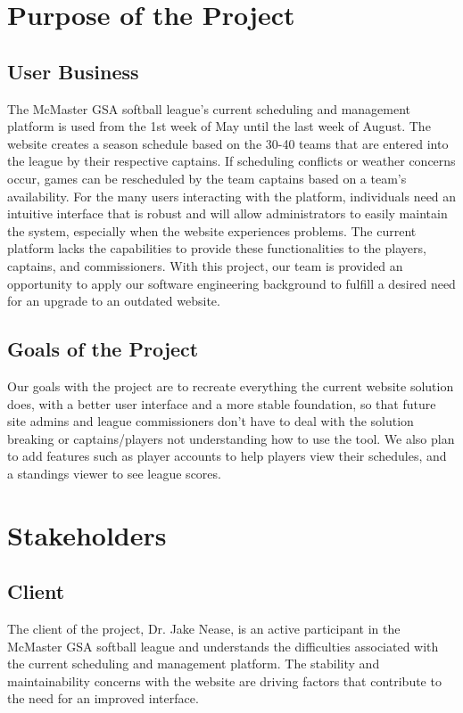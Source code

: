 \documentclass[12pt]{article}
\begin{document}
\section{Purpose of the Project}

\subsection{User Business}

The McMaster GSA softball league's current scheduling and management platform
is used from the 1st week of May until the last week of August. The website
creates a season schedule based on the 30-40 teams that are entered into the
league by their respective captains. If scheduling conflicts or weather concerns
occur, games can be rescheduled by the team captains based on a team's
availability. For the many users interacting with the platform, individuals need
an intuitive interface that is robust and will allow administrators to easily
maintain the system, especially when the website experiences problems. The current
platform lacks the capabilities to provide these functionalities to the players,
captains, and commissioners. With this project, our team is provided an
opportunity to apply our software engineering background to fulfill a
desired need for an upgrade to an outdated website.

\subsection{Goals of the Project}
Our goals with the project are to recreate everything the current website
solution does, with a better user interface and a more stable foundation, so
that future site admins and league commissioners don't have to deal with the
solution breaking or captains/players not understanding how to use the tool.
We also plan to add features such as player accounts to help players view
their schedules, and a standings viewer to see league scores.

\section{Stakeholders}
\subsection{Client}

The client of the project, Dr. Jake Nease, is an active participant in the
McMaster GSA softball league and understands the difficulties associated with
the current scheduling and management platform. The stability and maintainability
concerns with the website are driving factors that contribute to the need for
an improved interface.
\end{document}
